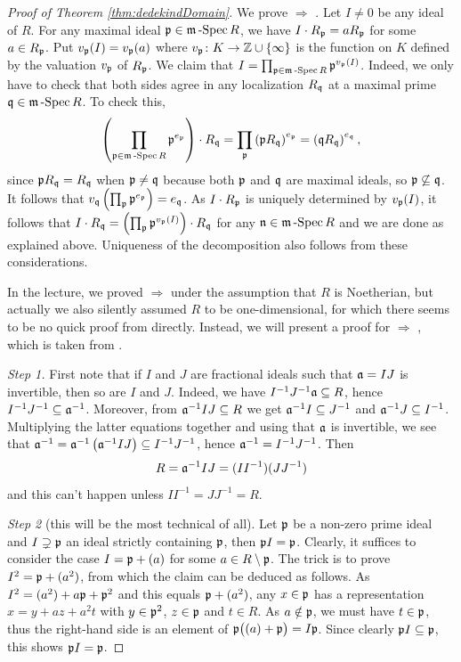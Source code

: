 \documentclass[a4paper,parskip=half,numbers=enddot, DIV=12]{scrreprt}
\begin{document}
\begin{proof}[Proof of Theorem \ref{thm:dedekindDomain}]
We prove  $\Rightarrow$ . Let $I\neq 0$ be any ideal of $R$. For any maximal ideal $\pp\in \mSpec R$, we have $I\cdot R_\pp = a R_\pp$
for some $a\in R_\pp$. Put $v_\pp(I) = v_\pp(a)$ where $v_\pp\colon K\morphism \mathbb Z\cup \{\infty\}$ is the
function on $K$ defined by the valuation $v_\pp$ of $R_\pp$.
We claim that $I=\prod_{\pp\in \mSpec R} \pp^{v_\pp(I)}$. Indeed, we only have to check that both sides agree in any localization $R_\qq$ at a maximal prime $\qq\in\mSpec R$. To check this,
\begin{align*}
\left(\prod_{\pp\in \mSpec R} \pp^{e_\pp}\right)\cdot R_\qq = \prod_{\pp}\left(\pp R_\qq\right)^{e_\pp} = \left(\qq R_\qq\right)^{e_\qq},
\end{align*}
since $\pp R_\qq = R_\qq$ when $\pp\neq \qq$ because
both $\pp$ and $\qq$ are maximal ideals, so $\pp\not\subseteq \qq$.
It follows that $v_\qq\left(\prod_\pp \pp^{e_\pp}\right) = e_\qq$. As $I\cdot R_\pp$ is uniquely determined by $v_\pp(I)$, it follows
that $I\cdot R_\qq = \left(\prod_\pp \pp^{v_\pp(I)}\right)\cdot R_\qq$ for any $\nn\in \mSpec R$ and we are done as explained above.
Uniqueness of the decomposition
also follows from these considerations.


In the lecture, we proved  $\Rightarrow$  under the assumption that $R$ is Noetherian, but actually we also silently assumed $R$ to be one-dimensional, for which there seems to be no quick proof from  directly. Instead, we will present a proof for  $\Rightarrow$ , which is taken from \cite[pp.~83-84]{matsumuraCRT}. 

\emph{Step 1.} First note that if $I$ and $J$ are fractional ideals such that $\aa=IJ$ is invertible, then so are $I$ and $J$. Indeed, we have $I^{-1}J^{-1}\aa\subseteq R$, hence $I^{-1}J^{-1}\subseteq \aa^{-1}$. Moreover, from $\aa^{-1}IJ\subseteq R$ we get $\aa^{-1}I\subseteq J^{-1}$ and $\aa^{-1}J\subseteq I^{-1}$. Multiplying the latter equations together and using that $\aa$ is invertible, we see that $\aa^{-1}=\aa^{-1}\left(\aa^{-1}IJ\right)\subseteq I^{-1}J^{-1}$, hence $\aa^{-1}=I^{-1}J^{-1}$. Then
\begin{align*}
	R=\aa^{-1}IJ=(II^{-1})(JJ^{-1})
\end{align*}
and this can't happen unless $II^{-1}=JJ^{-1}=R$.

\emph{Step 2} (this will be the most technical of all). Let $\pp$ be a non-zero prime ideal and $I\supsetneq\pp$ an ideal strictly containing $\pp$, then $\pp I=\pp$. Clearly, it suffices to consider the case $I=\pp+(a)$ for some $a\in R\setminus \pp$. The trick is to prove $I^2=\pp+(a^2)$, from which the claim can be deduced as follows. As $I^2=(a^2)+a\pp+\pp^2$ and this equals $\pp+(a^2)$, any $x\in\pp$ has a representation $x=y+az+a^2t$ with $y\in\pp^2$, $z\in \pp$ and $t\in R$. As $a\notin\pp$, we must have $t\in \pp$, thus the right-hand side is an element of $\pp\big((a)+\pp\big)=I\pp$. Since clearly $\pp I\subseteq\pp$, this shows $\pp I=\pp$.


\end{proof}
\end{document}

